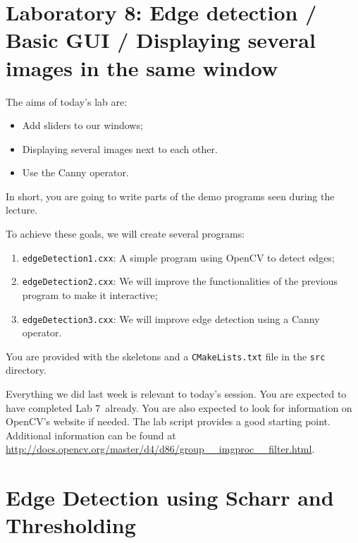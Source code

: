 \documentclass[english,a4paper,12pt,oneside]{article}
\begin{document}
\sloppy 

\section*{Laboratory 8: Edge detection / Basic GUI / Displaying several images in the same window}

\null\vfill
The aims of today's lab are:
\begin{itemize}
	\item Add sliders to our windows;
	\item Displaying several images next to each other.
	\item Use the Canny operator.
\end{itemize}
In short, you are going to write parts of the demo programs seen during the lecture.

To achieve these goals, we will create several programs:
\begin{enumerate}
	\item \verb+edgeDetection1.cxx+: A simple program using OpenCV to detect edges;
	\item \verb+edgeDetection2.cxx+: We will improve the functionalities of the previous program to make it interactive;
	\item \verb+edgeDetection3.cxx+: We will improve edge detection using a Canny operator.
\end{enumerate}
You are provided with the skeletons and a \verb+CMakeLists.txt+  file in the \verb+src+ directory. 

Everything we did last week is relevant to today's session. 
You are expected to have completed Lab 7~already. 
You are also expected to look for information on OpenCV's website if needed. 
The lab script provides a good starting point. 
Additional information can be found at \url{http://docs.opencv.org/master/d4/d86/group__imgproc__filter.html}.
\vfill\null

\newpage
\section{Edge Detection using Scharr and Thresholding}
\end{document}
